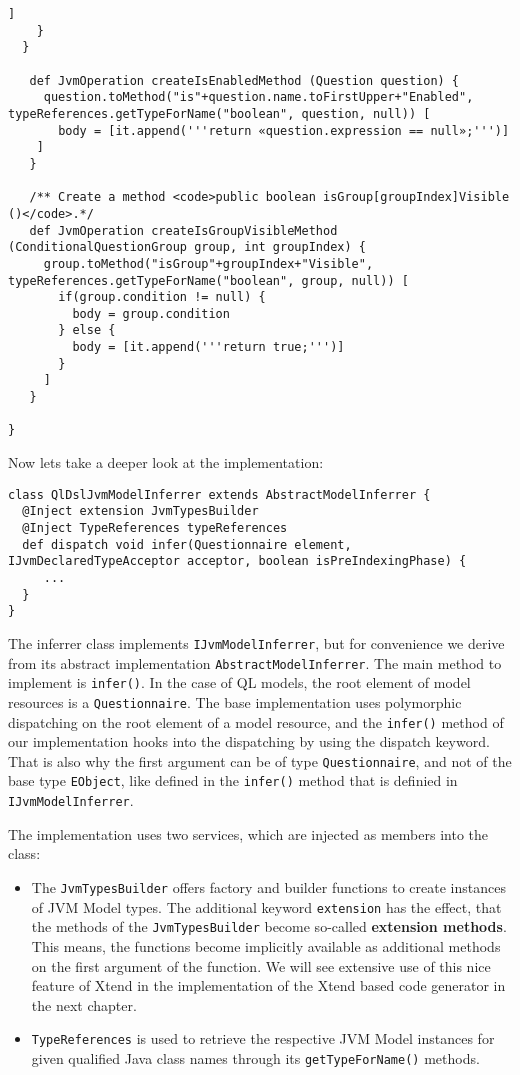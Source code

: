 \begin{lstlisting}[language=Xtend]
      ]
    }
  }

   def JvmOperation createIsEnabledMethod (Question question) {
     question.toMethod("is"+question.name.toFirstUpper+"Enabled", typeReferences.getTypeForName("boolean", question, null)) [
       body = [it.append('''return «question.expression == null»;''')]
    ]
   }

   /** Create a method <code>public boolean isGroup[groupIndex]Visible ()</code>.*/
   def JvmOperation createIsGroupVisibleMethod (ConditionalQuestionGroup group, int groupIndex) {
     group.toMethod("isGroup"+groupIndex+"Visible", typeReferences.getTypeForName("boolean", group, null)) [
       if(group.condition != null) {
         body = group.condition
       } else {
         body = [it.append('''return true;''')]
       }
     ]
   }

}
\end{lstlisting}

Now lets take a deeper look at the implementation:

\begin{lstlisting}[language=Xtend]
class QlDslJvmModelInferrer extends AbstractModelInferrer {
  @Inject extension JvmTypesBuilder
  @Inject TypeReferences typeReferences
  def dispatch void infer(Questionnaire element, IJvmDeclaredTypeAcceptor acceptor, boolean isPreIndexingPhase) {
     ...
  }
}
\end{lstlisting}

The inferrer class implements \texttt{IJvmModelInferrer}, but for convenience we derive
from its abstract implementation \texttt{AbstractModelInferrer}. The main method to
implement is \texttt{infer()}. In the case of QL models, the root element
of model resources is a \texttt{Questionnaire}. The base implementation uses polymorphic dispatching on
the root element of a model resource, and the \texttt{infer()} method of our
implementation hooks into the dispatching by using the dispatch keyword. That is
also why the first argument can be of type \texttt{Questionnaire}, and not of the base
type \texttt{EObject}, like defined in the \texttt{infer()} method that is definied in
\texttt{IJvmModelInferrer}.

The implementation uses two services, which are injected as members into the
class:
\begin{itemize}
\item The \texttt{JvmTypesBuilder} offers factory and builder functions to create
instances of JVM Model types. The additional keyword \texttt{extension} has the effect,
that the methods of the \texttt{JvmTypesBuilder} become so-called \textbf{extension methods}.
This means, the functions become implicitly available as additional
methods on the first argument of the function. We will see extensive use of this
nice feature of Xtend in the implementation of the Xtend based code generator in
the next chapter.
\item \texttt{TypeReferences} is used to retrieve the respective JVM Model instances for
given qualified Java class names through its \texttt{getTypeForName()} methods. 
\end{itemize}

